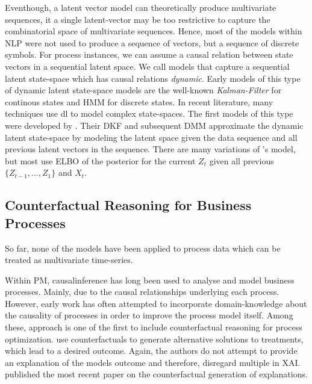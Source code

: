 \documentclass[12pt,a4paper]{report}
\begin{document}
Eventhough, a latent vector model can theoretically produce multivariate sequences, it a single latent-vector may be too restrictive to capture the combinatorial space of multivariate sequences. Hence, most of the models within \gls{NLP} were not used to produce a sequence of vectors, but a sequence of discrete symbols. For process instances, we can assume a causal relation between state vectors in a sequential latent space. We call models that capture a sequential latent state-space which has causal relations \emph{dynamic}\autocite{leglaive_RecurrentVariationalAutoencoder_2020}. Early models of this type of dynamic latent state-space models are the well-known \emph{Kalman-Filter} for continous states and \gls{HMM} for discrete states. In recent literature, many techniques use \gls{dl} to model complex state-spaces. The first models of this type were developed by \citeauthor{krishnan_StructuredInferenceNetworks_2017}. Their \gls{DKF} and subsequent \gls{DMM} approximate the dynamic latent state-space by modeling the latent space given the data sequence and all previous latent vectors in the sequence. There are many variations of \citeauthor{krishnan_StructuredInferenceNetworks_2017}'s model, but most use \gls{ELBO} of the posterior for the current $Z_{t}$ given all previous $\{Z_{t-1},\ldots,Z_{1}\}$ and $X_{t}$.

\subsection{Counterfactual Reasoning for Business Processes}
So far, none of the models have been applied to process data which can be treated as multivariate time-series.

Within \gls{PM}, \gls{causalinference} has long been used to analyse and model business processes. Mainly, due to the causal relationships underlying each process. However, early work has often attempted to incorporate domain-knowledge about the causality of processes in order to improve the process model itself\autocites{shook_AssessmentUseStructural_2004,baker_ClosingLoopEmpirical_2017,hompes_DiscoveringCausalFactors_2017,wang_CounterfactualDataAugmentedSequential_2021}.
Among these, \citeauthor{narendra_CounterfactualReasoningProcess_2019} approach is one of the first to include counterfactual reasoning for process optimization.
\citeauthor{oberst_CounterfactualOffPolicyEvaluation_2019} use counterfactuals to generate alternative solutions to treatments, which lead to a desired outcome.
Again, the authors do not attempt to provide an explanation of the models outcome and therefore, disregard multiple  in \gls{XAI}. \autocite{qafari_CaseLevelCounterfactual_2021} published the most recent paper on the counterfactual generation of explanations. 
\end{document}
